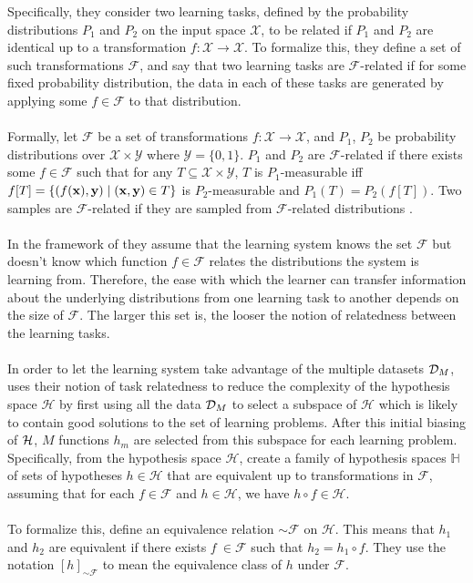 Specifically, they consider two learning tasks, defined by the probability distributions $P_1$ and $P_2$ on the input space $\mathcal{X}$, to be related if $P_1$ and $P_2$ are identical up to a transformation $f: \mathcal{X} \to \mathcal{X}$. To formalize this, they define a set of such transformations $\mathcal{F}$, and say that two learning tasks are $\mathcal{F}$-related if for some fixed probability distribution, the data in each of these tasks are generated by applying some $f \in \mathcal{F}$ to that distribution.
\\\\
Formally, let $\mathcal{F}$ be a set of transformations $f: \mathcal{X} \to \mathcal{X}$, and $P_1$, $P_2$ be probability distributions over $\mathcal{X} \times \mathcal{Y}$ where $\mathcal{Y} = \{0,1\}$. $P_1$ and $P_2$ are $\mathcal{F}$-related if there exists some $f \in \mathcal{F}$ such that for any $T \subseteq \mathcal{X} \times \mathcal{Y}$, $T$ is $P_1$-measurable iff $f[T] = \{(f(\mathbf{x}), \mathbf{y}) \mid (\mathbf{x}, \mathbf{y}) \in T\}$ is $P_2$-measurable and $P_1(T) = P_2(f[T])$. Two samples are $\mathcal{F}$-related if they are sampled from $\mathcal{F}$-related distributions \citep{ben2003}.
\\\\
In the framework of \citet{ben2003} they assume that the learning system knows the set $\mathcal{F}$ but doesn't know which function $f \in \mathcal{F}$ relates the distributions the system is learning from. Therefore, the ease with which the learner can transfer information about the underlying distributions from one learning task to another depends on the size of $\mathcal{F}$. The larger this set is, the looser the notion of relatedness between the learning tasks.
\\\\
In order to let the learning system take advantage of the multiple datasets $\mathcal{D}_M$, \citet{ben2003} uses their notion of task relatedness to reduce the complexity of the hypothesis space $\mathcal{H}$ by first using all the data $\mathcal{D}_M$ to select a subspace of $\mathcal{H}$ which is likely to contain good solutions to the set of learning problems. After this initial biasing of $\mathcal{H}$, $M$ functions $h_m$ are selected from this subspace for each learning problem. Specifically, from the hypothesis space $\mathcal{H}$, create a family of hypothesis spaces $\mathbb{H}$ of sets of hypotheses $h \in \mathcal{H}$ that are equivalent up to transformations in $\mathcal{F}$, assuming that for each $f \in \mathcal{F}$ and $h \in \mathcal{H}$, we have $h \circ f \in \mathcal{H}$. 
\\\\
To formalize this, \citet{ben2003} define an equivalence relation $\sim \mathcal{F}$ on $\mathcal{H}$. This means that $h_1$ and $h_2$ are equivalent if there exists $f\ \in \mathcal{F}$ such that $h_2 = h_1 \circ f$. They use the notation $[h]_{\sim \mathcal{F}}$ to mean the equivalence class of $h$ under $\mathcal{F}$. 

